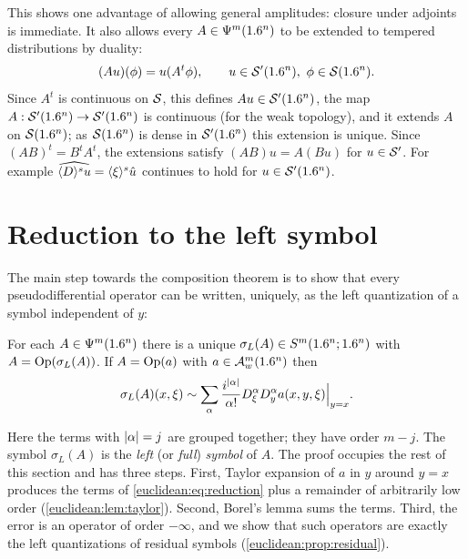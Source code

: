 This shows one advantage of allowing general amplitudes: closure under
adjoints is immediate. It also allows every $A\in\Psi^{m}(1.6^n)$ to be
extended to tempered distributions by duality:
\begin{equation}\label{euclidean:eq:S'-action}
  (Au)(\phi)=u(A^t\phi),\qquad u\in\cSp(\R^n),\ \phi\in\cS(\R^n).
\end{equation}
Since $A^t$ is continuous on $\mathcal{S}$, this defines $Au\in\mathcal{S}'(1.6^n)$, the map
$A:\mathcal{S}'(1.6^n)\to\mathcal{S}'(1.6^n)$ is continuous (for the weak topology), and it
extends $A$ on $\mathcal{S}(1.6^n)$; as $\mathcal{S}(1.6^n)$ is dense in $\mathcal{S}'(1.6^n)$ this
extension is unique. Since $(AB)^t=B^tA^t$, the extensions satisfy
$(AB)u=A(Bu)$ for $u\in\mathcal{S}'$. For example
$\widehat{\langle D\rangle^su}=\langle \xi\rangle^s\hat u$ continues to hold for $u\in\mathcal{S}'(1.6^n)$.

\section{Reduction to the left symbol}\label{euclidean:sec:reduction}

The main step towards the composition theorem is to show that every
pseudodifferential operator can be written, uniquely, as the left
quantization of a symbol independent of $y$:

\begin{theorem}[Reduction]\label{euclidean:thm:reduction}
  For each $A\in\Psi^{m}(1.6^n)$ there is a unique
  $\sigma_L(A)\in S^m(1.6^n;1.6^n)$ with $A=\operatorname{Op}(\sigma_L(A))$. If
  $A=\operatorname{Op}(a)$ with $a\in\mathcal{A}^{m}_{w}(1.6^n)$ then
  \begin{equation}\label{euclidean:eq:reduction}
    \sigma_L(A)(x,\xi)\sim\sum_{\alpha}\frac{i^{\lvert \alpha\rvert}}{\alpha!}
    D^\alpha_\xi D^\alpha_ya(x,y,\xi)\Big|_{y=x}.
  \end{equation}
\end{theorem}

Here the terms with $\lvert \alpha\rvert=j$ are grouped together; they have order
$m-j$. The symbol $\sigma_L(A)$ is the \emph{left} (or \emph{full})
\emph{symbol} of $A$. The proof occupies the rest of this section and has three steps.
First, Taylor expansion of $a$ in $y$ around $y=x$ produces the terms of
\eqref{euclidean:eq:reduction} plus a remainder of arbitrarily low order
(\cref{euclidean:lem:taylor}). Second, Borel's lemma sums the terms. Third, the error is
an operator of order $-\infty$, and we show that such operators are exactly the left
quantizations of residual symbols (\cref{euclidean:prop:residual}).

